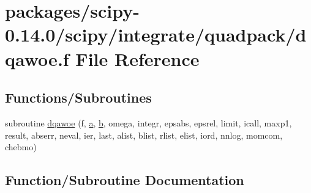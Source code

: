 \hypertarget{dqawoe_8f}{}\section{packages/scipy-\/0.14.0/scipy/integrate/quadpack/dqawoe.f File Reference}
\label{dqawoe_8f}
\subsection*{Functions/\+Subroutines}
\begin{DoxyCompactItemize}
\item 
subroutine \hyperlink{dqawoe_8f_ad36d43d285454b23e26b1131fa6c18c7}{dqawoe} (f, \hyperlink{gen__mat5files_8m_aae328bf20413f220e38aec4d95bfd6da}{a}, \hyperlink{gen__mat5files_8m_a7b38767b3b6a8dae167e5afa4fc340b0}{b}, omega, integr, epsabs, epsrel, limit, icall, maxp1, result, abserr, neval, ier, last, alist, blist, rlist, elist, iord, nnlog, momcom, chebmo)
\end{DoxyCompactItemize}


\subsection{Function/\+Subroutine Documentation}
\hypertarget{dqawoe_8f_ad36d43d285454b23e26b1131fa6c18c7}{}
